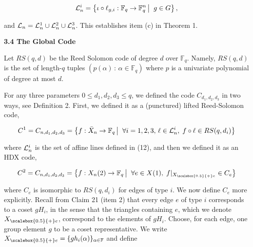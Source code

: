 \documentclass[10pt,a4paper]{article}
\begin{document}
\[\begin{gathered}
{\cal L}_{n}^{i}=\left\{\iota\circ\ell_{g,i}:\mathbb{F}_{q}\to\mathbb{F}_{q}^{n}\left|\;\vphantom{\iota\circ\ell_{g,i}:\mathbb{F}_{q}\to\mathbb{F}_{q}^{n}g\in G}\right.g\in G\right\},
\end{gathered}\]


and ${\cal L}_{n}={\cal L}_{n}^{1}\cup{\cal L}_{n}^{2}\cup{\cal L}_{n}^{3}$.
This establishes item (c) in Theorem 1.\par






\par\medskip\noindent\textbf{
3.4 The Global Code}\par




Let $RS(q,d)$ be the Reed Solomon code of degree $d$ over $\mathbb{F}_{q}$. Namely, $RS(q,d)$ is the set of length-$q$ tuples $(p(\alpha)\,:\,\alpha\in\mathbb{F}_{q})$ where $p$ is a univariate polynomial of degree at most $d$.\par




For any three parameters $0\leq d_{1},d_{2},d_{3}\leq q$, we defined the code $C_{d_{1},d_{2},d_{3}}$ in two ways, see Definition 2.
First, we defined it as a (punctured) lifted Reed-Solomon code,\par


\[\begin{gathered}
\displaystyle C^{1}=C_{n,d_{1},d_{2},d_{3}} \displaystyle=\left\{f:\bar{X}_{n}\to\mathbb{F}_{q}\left|\;\vphantom{f:\bar{X}_{n}\to\mathbb{F}_{q}\forall i=1,2,3,\,\ell\in{\cal L}_{n}^{i},\;f\circ\ell\in
RS(q,d_{i})}\right.\forall i=1,2,3,\,\ell\in{\cal L}_{n}^{i},\;f\circ\ell\in RS(q,d_{i})\right\}
\end{gathered}\]


where ${\cal L}_{n}^{i}$ is the set of affine lines defined in (12),
and then we defined it as an HDX code,\par


\[\begin{gathered}
\displaystyle C^{2}=C_{n,d_{1},d_{2},d_{3}} \displaystyle=\left\{f:X_{n}(2)\to\mathbb{F}_{q}\left|\;\vphantom{f:X_{n}(2)\to\mathbb{F}_{q}\forall e\in X(1),\;f|_{{X}_{\scalebox{0.5}{+}e}}\in C_{e}}\right.\forall e\in X(1),\;f|_{{X}_{\scalebox{0.5}{+}e}}\in C_{e}\right\}
\end{gathered}\]


where $C_{e}$ is isomorphic to $RS(q,d_{i})$ for edges of type $i$. We now define $C_{e}$ more explicitly. Recall from Claim 21 (item 2) that every edge $e$ of type $i$ corresponds to a coset $gH_{i}$, in the sense that the triangles containing $e$, which we denote ${X}_{\scalebox{0.5}{+}e}$, correspond to the elements of $gH_{i}$. Choose, for each edge, one group element $g$ to be a coset representative. We write ${X}_{\scalebox{0.5}{+}e}=\{gh_{i}(\alpha)\}_{\alpha\in\mathbb{F}}$ and define\par
\end{document}
